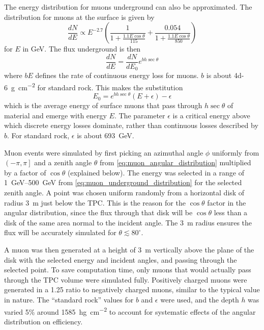 \documentclass[herrin-thesis.tex]{subfiles}
\begin{document}
The energy distribution for muons underground can also be approximated\cite{Gaisser:1990kx}. The distribution for muons at the surface is given by
\begin{equation}
\label{eq:muon_surface_distribution}
\frac{dN}{dE} \propto E^{-2.7}\left(\frac{1}{1+\frac{1.1 E \cos \theta}{115}} + \frac{0.054}{1+\frac{1.1 E \cos \theta}{850}}\right)
\end{equation}
for \(E\) in \si{\GeV}. The flux underground is then
\begin{equation}
\label{eq:muon_underground_distribution}
\frac{dN}{dE} = \frac{dN}{dE_0}e^{b h \sec \theta}
\end{equation}
where \(b E\) defines the rate of continuous energy loss for muons. \(b\) is about \SI{4d-6}{\g\per\square\cm} for standard rock. This makes the substitution
\begin{equation}
\label{eq:muon_E0_def}
E_0 = e^{b h \sec \theta}\left(E + \epsilon\right) - \epsilon
\end{equation}
which is the average energy of surface muons that pass through \(h\sec\theta\) of material and emerge with energy \(E\). The parameter \(\epsilon\) is a critical energy above which discrete energy losses dominate, rather than continuous losses described by \(b\). For standard rock, \(\epsilon\) is about \SI{693}{\GeV}\cite{groom:2001ys}.

Muon events were simulated by first picking an azimuthal angle \(\phi\) uniformly from \(\left(-\pi, \pi\right]\) and a zenith angle \(\theta\) from \cref{eq:muon_angular_distribution} multiplied by a factor of \(\cos\theta\) (explained below). The energy was selected in a range of \SIrange{1}{500}{\GeV} from \cref{eq:muon_underground_distribution} for the selected zenith angle. A point was chosen uniform randomly from a horizontal disk of radius \SI{3}{\m} just below the TPC. This is the reason for the \(\cos\theta\) factor in the angular distribution, since the flux through that disk will be \(\cos\theta\) less than a disk of the same area normal to the incident angle. The \SI{3}{\m} radius ensures the flux will be accurately simulated for \(\theta \lesssim 80^{\circ}\).

A muon was then generated at a height of \SI{3}{\meter} vertically above the plane of the disk with the selected energy and incident angles, and passing through the selected point. To save computation time, only muons that would actually pass through the TPC volume were simulated fully. Positively charged muons were generated in a 1.25 ratio to negatively charged muons, similar to the typical value in nature. The ``standard rock'' values for \(b\) and \(\epsilon\) were used, and the depth \(h\) was varied 5\% around \SI{1585}{\hecto\g\per\square\cm} to account for systematic effects of the angular distribution on efficiency.
\end{document}
